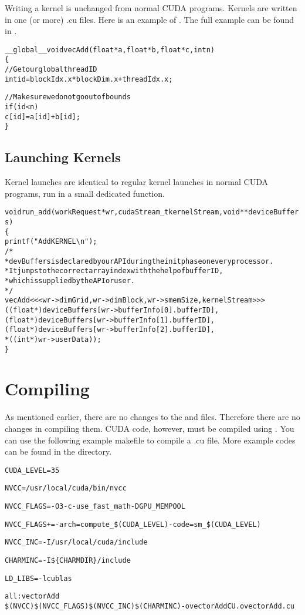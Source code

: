 \documentclass[10pt]{report}
\begin{document}
Writing a kernel is unchanged from normal CUDA programs.
Kernels are written in one (or more) .cu files.
Here is an example of .
The full example can be found in .

\begin{alltt}
__global__ void vecAdd(float *a, float *b, float *c, int n)
\{
    // Get our global thread ID
    int id = blockIdx.x * blockDim.x + threadIdx.x;

    // Make sure we do not go out of bounds
    if (id < n)
        c[id] = a[id] + b[id];
\}
\end{alltt}

\subsection{Launching Kernels}

Kernel launches are identical to regular kernel launches in normal CUDA
programs, run in a small dedicated function.

\begin{alltt}
void run_add(workRequest *wr, cudaStream_t kernelStream, void **deviceBuffers)
\{
    printf("Add KERNEL \textbackslash{n}");
/*
 *  devBuffers is declared by our API during the init phase on every processor.
 *  It jumps to the correct array index with the help of bufferID, 
 *  which is supplied by the API or user.
 */
    vecAdd<<< wr->dimGrid, wr->dimBlock, wr->smemSize, kernelStream>>>
        ((float *) deviceBuffers[wr->bufferInfo[0].bufferID],
         (float *) deviceBuffers[wr->bufferInfo[1].bufferID],
         (float *) deviceBuffers[wr->bufferInfo[2].bufferID],
         *((int *) wr->userData));
\}
\end{alltt}

\section{Compiling}

As mentioned earlier, there are no changes to the  and 
files. Therefore there are no changes in compiling them.
CUDA code, however, must be compiled using .
You can use the following example makefile to compile a .cu file.
More example codes can be found in the  directory.

\begin{alltt}
CUDA_LEVEL=35

NVCC = /usr/local/cuda/bin/nvcc

NVCC_FLAGS = -O3 -c -use_fast_math -DGPU_MEMPOOL

NVCC_FLAGS += -arch=compute_\$(CUDA_LEVEL) -code=sm_\$(CUDA_LEVEL)

NVCC_INC = -I/usr/local/cuda/include

CHARMINC = -I\$\{CHARMDIR\}/include

LD_LIBS= -lcublas

all: vectorAdd
\qquad\$(NVCC) \$(NVCC_FLAGS) \$(NVCC_INC) \$(CHARMINC) -o vectorAddCU.o vectorAdd.cu
\end{alltt}
\end{document}
